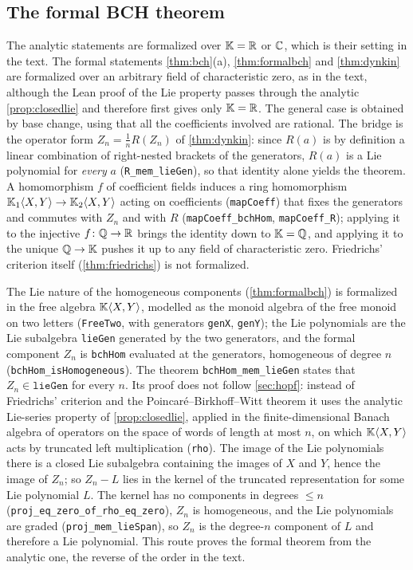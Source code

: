 \subsection*{The formal BCH theorem}
The analytic statements are formalized over $\mathbb{K}=\mathbb{R}$ or $\mathbb{C}$, which is their
setting in the text. The formal statements \cref{thm:bch}(a),
\cref{thm:formalbch} and \cref{thm:dynkin} are formalized over an arbitrary
field of characteristic zero, as in the text, although the Lean proof of the
Lie property passes through the analytic \cref{prop:closedlie} and therefore
first gives only $\mathbb{K}=\mathbb{R}$. The general case is obtained by base change, using
that all the coefficients involved are rational. The bridge is the operator
form $Z_n=\frac1nR(Z_n)$ of \cref{thm:dynkin}: since $R(a)$ is by definition a
linear combination of right-nested brackets of the generators, $R(a)$ is a Lie
polynomial for \emph{every} $a$ (\texttt{R\_mem\_lieGen}), so that identity
alone yields the theorem. A homomorphism $f$ of coefficient fields induces a
ring homomorphism $\mathbb{K}_1\langle X,Y\rangle\to\mathbb{K}_2\langle X,Y\rangle$ acting on
coefficients (\texttt{mapCoeff}) that fixes the generators and commutes with
$Z_n$ and with $R$ (\texttt{mapCoeff\_bchHom}, \texttt{mapCoeff\_R}); applying
it to the injective $f\colon\mathbb{Q}\to\mathbb{R}$ brings the identity down to $\mathbb{K}=\mathbb{Q}$, and
applying it to the unique $\mathbb{Q}\to\mathbb{K}$ pushes it up to any field of
characteristic zero. Friedrichs' criterion itself (\cref{thm:friedrichs}) is
not formalized.

The Lie nature of the homogeneous components (\cref{thm:formalbch}) is
formalized in the free algebra $\mathbb{K}\langle X,Y\rangle$, modelled as the
monoid algebra of the free monoid on two letters (\texttt{FreeTwo}, with
generators \texttt{genX}, \texttt{genY}); the Lie polynomials are the Lie
subalgebra \texttt{lieGen} generated by the two generators, and the formal
component $Z_n$ is \texttt{bchHom} evaluated at the generators, homogeneous of
degree $n$ (\texttt{bchHom\_isHomogeneous}). The theorem
\texttt{bchHom\_mem\_lieGen} states that $Z_n\in\texttt{lieGen}$ for every
$n$. Its proof does not follow \cref{sec:hopf}: instead of Friedrichs'
criterion and the Poincar\'e--Birkhoff--Witt theorem it uses the analytic
Lie-series property of \cref{prop:closedlie}, applied in the
finite-dimensional Banach algebra of operators on the space of words of
length at most $n$, on which $\mathbb{K}\langle X,Y\rangle$ acts by truncated left
multiplication (\texttt{rho}). The image of the Lie polynomials there is a
closed Lie subalgebra containing the images of $X$ and $Y$, hence the image
of $Z_n$; so $Z_n-L$ lies in the kernel of the truncated representation for
some Lie polynomial $L$. The kernel has no components in degrees $\leq n$
(\texttt{proj\_eq\_zero\_of\_rho\_eq\_zero}), $Z_n$ is homogeneous, and the
Lie polynomials are graded (\texttt{proj\_mem\_lieSpan}), so $Z_n$ is the
degree-$n$ component of $L$ and therefore a Lie polynomial. This route proves
the formal theorem from the analytic one, the reverse of the order in the
text.

